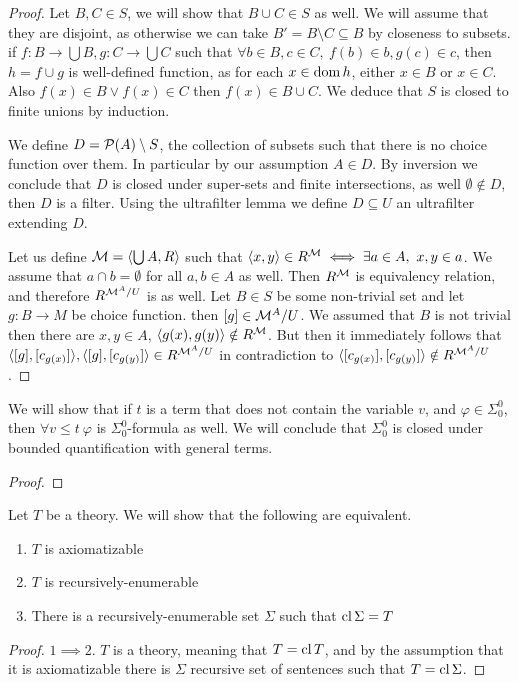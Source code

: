 \begin{proof}
	Let $B, C \in S$, we will show that $B \cup C \in S$ as well.
	We will assume that they are disjoint, as otherwise we can take $B' = B \setminus C \subseteq B$ by closeness to subsets.
	if $f : B \to \bigcup B, g : C \to \bigcup C$ such that $\forall b \in B, c \in C,\ f(b) \in b, g(c) \in c$, then $h = f \cup g$ is well-defined function,
	as for each $x \in \operatorname{dom} h$, either $x \in B$ or $x \in C$.
	Also $f(x) \in B \lor f(x) \in C$ then $f(x) \in B \cup C$.
	We deduce that $S$ is closed to finite unions by induction.

	We define $D = \mathcal{P}(A) \setminus S$, the collection of subsets such that there is no choice function over them. In particular by our assumption $A \in D$.
	By inversion we conclude that $D$ is closed under super-sets and finite intersections, as well $\emptyset \notin D$, then $D$ is a filter.
	Using the ultrafilter lemma we define $D \subseteq U$ an ultrafilter extending $D$.

	Let us define $\mathcal{M} = \langle \bigcup A, R \rangle$ such that $\langle x, y \rangle \in R^{\mathcal{M}} \iff \exists a \in A,\ x, y \in a$.
	We assume that $a \cap b = \emptyset$ for all $a, b \in A$ as well.
	Then $R^{\mathcal{M}}$ is equivalency relation, and therefore $R^{\mathcal{M}^A / U}$ is as well.
	Let $B \in S$ be some non-trivial set and let $g : B \to M$ be choice function.
	then $[g] \in \mathcal{M}^A / U$.
	We assumed that $B$ is not trivial then there are $x, y \in A$, $\langle g(x), g(y) \rangle \notin R^{\mathcal{M}}$.
	But then it immediately follows that $\langle [g], [c_{g(x)}] \rangle, \langle [g], [c_{g(y)}] \rangle \in R^{\mathcal{M}^A / U}$ in contradiction to $\langle [c_{g(x)}], [c_{g(y)}] \rangle \notin R^{\mathcal{M}^A / U}$.
\end{proof}

\question{}
We will show that if $t$ is a term that does not contain the variable $v$, and $\varphi \in \Sigma_0^0$,
then $\forall v \le t\ \varphi$ is $\Sigma_0^0$-formula as well.
We will conclude that $\Sigma_0^0$ is closed under bounded quantification with general terms.
\begin{proof}
	
\end{proof}

\question{}
Let $T$ be a theory.
We will show that the following are equivalent.
\begin{enumerate}
	\item $T$ is axiomatizable
	\item $T$ is recursively-enumerable
	\item There is a recursively-enumerable set $\Sigma$ such that $\operatorname{cl} \Sigma = T$
\end{enumerate}
\begin{proof}
	$1 \implies 2$.
	$T$ is a theory, meaning that $T = \operatorname{cl} T$, and by the assumption that it is axiomatizable there is $\Sigma$ recursive set of sentences such that $T = \operatorname{cl} \Sigma$.
\end{proof}


